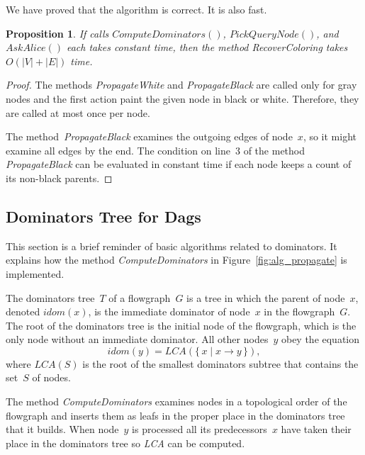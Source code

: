 \documentclass[a4paper]{article}
\theoremstyle{slanted}
\newtheorem{proposition}{Proposition}
\theoremstyle{definition}
\theoremstyle{remark}
\begin{document}
We have proved that the algorithm is correct. It is also fast.

\begin{proposition}
If calls $\mathit{ComputeDominators}()$, $\mathit{PickQueryNode}()$,
and $\mathit{AskAlice}()$ each takes constant time, then the method
\textit{RecoverColoring} takes $O(|V|+|E|)$ time.
\end{proposition}

\begin{proof}
The methods \textit{PropagateWhite} and \textit{PropagateBlack}
are called only for gray nodes and the first action paint the
given node in black or white. Therefore, they are called at most
once per node.

The method~\textit{PropagateBlack} examines the outgoing edges of
node~$x$, so it might examine all edges by the end. The condition
on line~3 of the method \textit{PropagateBlack} can be evaluated
in constant time if each node keeps a count of its non-black
parents.
\end{proof}


\subsection{Dominators Tree for Dags}
\label{sec:ra.dominators}

This section is a brief reminder of basic algorithms related to
dominators. It explains how the method \textit{ComputeDominators}
in Figure~\ref{fig:alg_propagate} is implemented.

The dominators tree~$T$ of a flowgraph~$G$ is a tree in which the
parent of node~$x$, denoted $\mathit{idom}(x)$, is the immediate
dominator of node~$x$ in the flowgraph~$G$. The root of the
dominators tree is the initial node of the flowgraph, which is
the only node without an immediate dominator. All other nodes~$y$
obey the equation
\begin{equation}
\mathit{idom}(y)=\mathit{LCA}(\{\,x\mid x\to y\,\}),
\end{equation}
where $\mathit{LCA}(S)$ is the root of the smallest dominators
subtree that contains the set~$S$ of nodes.

The method \textit{ComputeDominators} examines nodes in a
topological order of the flowgraph and inserts them as leafs in
the proper place in the dominators tree that it builds. When
node~$y$ is processed all its predecessors~$x$ have taken their
place in the dominators tree so \textit{LCA} can be computed.
\end{document}
